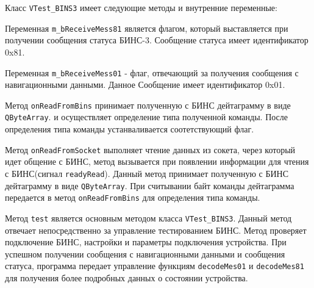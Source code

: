 Класс \texttt{VTest\_BINS3} имеет следующие методы и внутренние переменные:
\begin{enum}
	\item Переменная \texttt{m\_bReceiveMess81} является флагом, который выставляется при получении сообщения
		статуса БИНС-3. Сообщение статуса имеет идентификатор 0x81.

	\item Переменная \texttt{m\_bReceiveMess01} - флаг, отвечающий за получения сообщения с навигационными данными.
		Данное Сообщение имеет идентификатор 0x01.

	\item Метод \texttt{onReadFromBins} принимает полученную с БИНС дейтаграмму в виде \texttt{QByteArray}.
		и осуществляет определение типа полученной команды. После определения типа команды устанваливается
		соотетствующий флаг.

	\item Метод \texttt{onReadFromSocket} выполняет чтение данных из сокета, через который идет общение с БИНС,
		метод вызывается при появлении информации для чтения с БИНС(сигнал \texttt{readyRead}).
		Данный метод принимает полученную с БИНС дейтаграмму в виде \texttt{QByteArray}.
		При считывании байт команды дейтаграмма передается в метод \texttt{onReadFromBins} для определения типа
		команды.

	\item Метод \texttt{test} является основным методом класса \texttt{VTest\_BINS3}. Данный метод отвечает
		непосредственно за управление тестированием БИНС. Метод проверяет подключение БИНС, настройки и
		параметры подключения устройства. При успешном получении сообщения с навигационными данными и сообщения
		статуса, программа передает управление функциям \texttt{decodeMes01} и \texttt{decodeMes81} для
		получения более подробных данных о состоянии устройства.


\end{enum}

